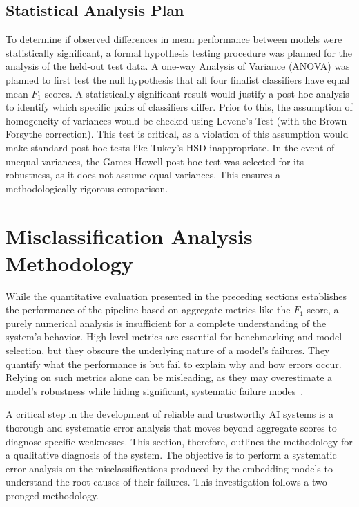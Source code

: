 \subsection{Statistical Analysis Plan}\label{ch:3.4.3}
To determine if observed differences in mean performance between models were statistically significant, a formal hypothesis testing procedure was planned for the analysis of the held-out test data.
A one-way Analysis of Variance (ANOVA) was planned to first test the null hypothesis that all four finalist classifiers have equal mean \(F_1\)-scores. A statistically significant result would justify a post-hoc analysis to identify which specific pairs of classifiers differ. Prior to this, the assumption of homogeneity of variances would be checked using Levene's Test (with the Brown-Forsythe correction). This test is critical, as a violation of this assumption would make standard post-hoc tests like Tukey's HSD inappropriate. In the event of unequal variances, the Games-Howell post-hoc test was selected for its robustness, as it does not assume equal variances. This ensures a methodologically rigorous comparison.

\section{Misclassification Analysis Methodology}\label{ch:3.5}
While the quantitative evaluation presented in the preceding sections establishes the performance of the pipeline based on aggregate metrics like the \(F_1\)-score, a purely numerical analysis is insufficient for a complete understanding of the system's behavior. High-level metrics are essential for benchmarking and model selection, but they obscure the underlying nature of a model's failures. They quantify what the performance is but fail to explain why and how errors occur. Relying on such metrics alone can be misleading, as they may overestimate a model's robustness while hiding significant, systematic failure modes~\cite{gauthier2022}.

A critical step in the development of reliable and trustworthy AI systems is a thorough and systematic error analysis that moves beyond aggregate scores to diagnose specific weaknesses. This section, therefore, outlines the methodology for a qualitative diagnosis of the system. The objective is to perform a systematic error analysis on the misclassifications produced by the embedding models to understand the root causes of their failures. This investigation follows a two-pronged methodology.

